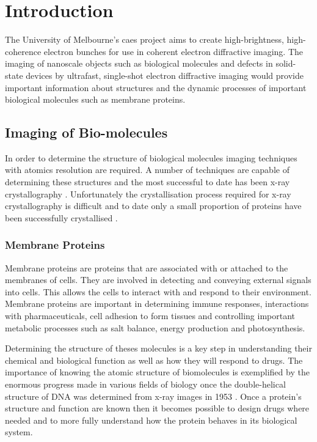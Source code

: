 \chapter{Introduction}

The University of Melbourne's \gls{caes} project aims to create high-brightness,  high-coherence electron bunches for use in coherent electron diffractive imaging. The imaging of nanoscale objects such as biological molecules \cite{dwyer_femtosecond_2006, williamson_clocking_1997} and defects in solid-state devices \cite{siwick_atomic-level_2003} by ultrafast, single-shot electron diffractive imaging would provide important information about structures and the dynamic processes of important biological molecules such as membrane proteins.

\section{Imaging of Bio-molecules}

In order to determine the structure of biological molecules imaging techniques with atomics resolution are required. A number of techniques are capable of determining these structures \cite{nettleship_methods_2008, svergun_small-angle_2003, opella_structure_2004} and the most successful to date has been x-ray crystallography \cite{kendrew_three-dimensional_1958, uson_advances_1999}. Unfortunately the crystallisation process required for x-ray crystallography is difficult and to date only a small proportion of proteins have been successfully crystallised \cite{geerlof_impact_2006}.

\subsection{Membrane Proteins}
Membrane proteins are proteins that are associated with or attached to the membranes of cells. They are involved in detecting and conveying external signals into cells. This allows the cells to interact with and respond to their environment\cite{almen_mapping_2009}. Membrane proteins are important in determining immune responses, interactions with pharmaceuticals, cell adhesion to form tissues and controlling important metabolic processes such as salt balance, energy production and photosynthesis\cite{chiras_human_2011}.

Determining the structure of theses molecules is a key step in understanding their chemical and biological function as well as how they will respond to drugs. The importance of knowing the atomic structure of biomolecules is exemplified by the enormous progress made in various fields of biology once the double-helical structure of DNA was determined from x-ray images in 1953 \cite{watson_molecular_1953}. Once a protein's structure and function are known then it becomes possible to design drugs \cite{pinto_influenza_1992} where needed and to more fully understand how the protein behaves in its biological system.

